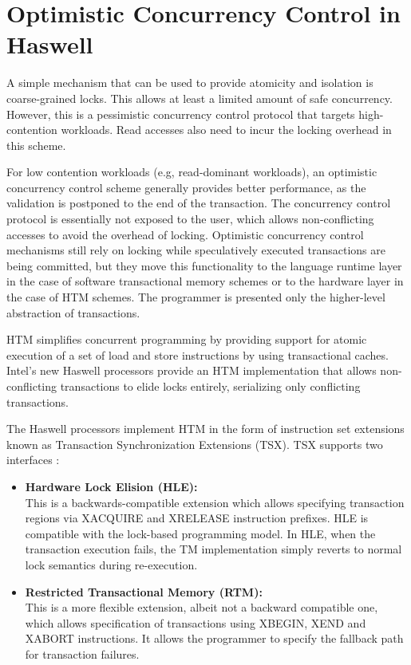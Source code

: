 \section{Optimistic Concurrency Control in Haswell} \label{sec:tm}

A simple mechanism that can be used to provide atomicity and isolation is
coarse-grained locks. This allows at least a limited amount of safe concurrency.
However, this is a pessimistic concurrency control protocol that targets
high-contention workloads. Read accesses also need to incur the locking overhead
in this scheme.

For low contention workloads (e.g, read-dominant workloads), an optimistic
concurrency control scheme generally provides better performance, as the
validation is postponed to the end of the transaction. The concurrency control
protocol is essentially not exposed to the user, which allows non-conflicting
accesses to avoid the overhead of locking.  Optimistic concurrency control
mechanisms still rely on locking while speculatively executed transactions are
being committed, but they move this functionality to the language runtime layer
in the case of software transactional memory schemes or to the hardware layer in
the case of HTM schemes. The programmer is presented only the higher-level
abstraction of transactions.

HTM simplifies concurrent programming by providing support for atomic execution
of a set of load and store instructions by using transactional caches. Intel's
new Haswell processors provide an HTM implementation that allows non-conflicting
transactions to elide locks entirely, serializing only conflicting transactions.

The Haswell processors implement HTM in the form of instruction set extensions
known as Transaction Synchronization Extensions (TSX). TSX supports two
interfaces \citep{tsx-intro}: \\

\begin{itemize} 
\item \textbf{Hardware Lock Elision (HLE):} \\ This is a backwards-compatible
  extension which allows specifying transaction regions via \textrm{XACQUIRE}
  and \textrm{XRELEASE} instruction prefixes. HLE is compatible with the
  lock-based programming model. In HLE, when the transaction execution fails,
  the TM implementation simply reverts to normal lock semantics during
  re-execution. \\
\item \textbf{Restricted Transactional Memory (RTM):} \\ This is a more flexible
  extension, albeit not a backward compatible one, which allows specification of
  transactions using \textrm{XBEGIN, XEND and XABORT} instructions. It allows
  the programmer to specify the fallback path for transaction failures. \\
\end{itemize}

